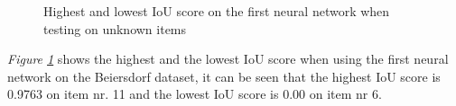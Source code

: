 \begin{figure}[h]
    \centering
    \hfill
    
    \caption{Highest and lowest IoU score on the first neural network when testing on unknown items}
    \label{fig:v1unknowniou}
\end{figure}
\textit{Figure \ref{fig:v1unknowniou}} shows the highest and the lowest IoU score when using the first neural network on the Beiersdorf dataset, it can be seen that the highest IoU score is 0.9763 on item nr. 11 and the lowest IoU score is 0.00 on item nr 6.


